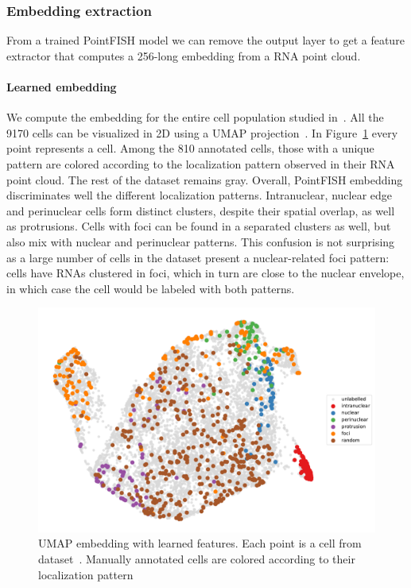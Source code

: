 \subsubsection{Embedding extraction}

From a trained PointFISH model we can remove the output layer to get a feature extractor that computes a 256-long embedding from a \ac{RNA} point cloud.

\paragraph{Learned embedding}

We compute the embedding for the entire cell population studied in~\cite{CHOUAIB_2020}.
All the 9170 cells can be visualized in 2D using a UMAP projection~\cite{McInnes2018}.
In Figure~\ref{fig:umap_real} every point represents a cell.
Among the 810 annotated cells, those with a unique pattern are colored according to the localization pattern observed in their \ac{RNA} point cloud.
The rest of the dataset remains gray.
Overall, PointFISH embedding discriminates well the different localization patterns.
Intranuclear, nuclear edge and perinuclear cells form distinct clusters, despite their spatial overlap, as well as protrusions.
Cells with foci can be found in a separated clusters as well, but also mix with nuclear and perinuclear patterns.
This confusion is not surprising as a large number of cells in the dataset present a nuclear-related foci pattern: cells have \ac{RNA}s clustered in foci, which in turn are close to the nuclear envelope, in which case the cell would be labeled with both patterns.

\begin{figure}[h]
    \centering
    \includegraphics[width=\textwidth]{figures/chapter4/umap_real}
    \caption{UMAP embedding with learned features.
	Each point is a cell from dataset~\cite{CHOUAIB_2020}.
	Manually annotated cells are colored according to their localization pattern}
    \label{fig:umap_real}
\end{figure}

